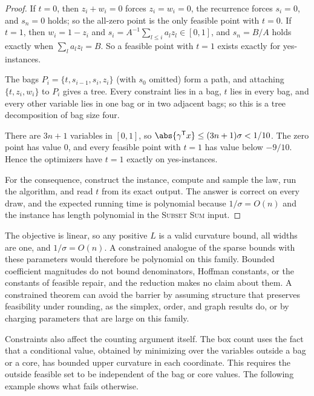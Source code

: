 \begin{proof}
If $t=0$, then $z_i+w_i=0$ forces $z_i=w_i=0$, the recurrence forces
$s_i=0$, and $s_n=0$ holds; so the all-zero point is the only feasible
point with $t=0$. If $t=1$, then $w_i=1-z_i$ and
$s_i=A^{-1}\sum_{l\le i}a_lz_l\in[0,1]$, and $s_n=B/A$ holds exactly when
$\sum_la_lz_l=B$. So a feasible point with $t=1$ exists exactly for
yes-instances.

The bags $P_i=\{t,s_{i-1},s_i,z_i\}$ (with $s_0$ omitted) form a path, and
attaching $\{t,z_i,w_i\}$ to $P_i$ gives a tree. Every constraint lies in a
bag, $t$ lies in every bag, and every other variable lies in one bag or in
two adjacent bags; so this is a tree decomposition of bag size four.

There are $3n+1$ variables in $[0,1]$, so
$\abs{\gamma^{\mathsf T}x}\le(3n+1)\sigma<1/10$. The zero point has value
$0$, and every feasible point with $t=1$ has value below $-9/10$. Hence the
optimizers have $t=1$ exactly on yes-instances.

For the consequence, construct the instance, compute and sample the law,
run the algorithm, and read $t$ from its exact output. The answer is
correct on every draw, and the expected running time is polynomial because
$1/\sigma=O(n)$ and the instance has length polynomial in the
\textsc{Subset Sum} input.
\end{proof}

The objective is linear, so any positive $L$ is a valid curvature bound, all
widths are one, and $1/\sigma=O(n)$. A constrained analogue of the sparse
bounds with these parameters would therefore be polynomial on this family.
Bounded coefficient magnitudes do not bound denominators, Hoffman constants,
or the constants of feasible repair, and the reduction makes no claim about
them. A constrained theorem can avoid the barrier by assuming structure
that preserves feasibility under rounding, as the simplex, order, and graph
results do, or by charging parameters that are large on this family.

Constraints also affect the counting argument itself. The box count uses
the fact that a conditional value, obtained by minimizing over the variables
outside a bag or a core, has bounded upper curvature in each coordinate.
This requires the outside feasible set to be independent of the bag or core
values. The following example shows what fails otherwise.

